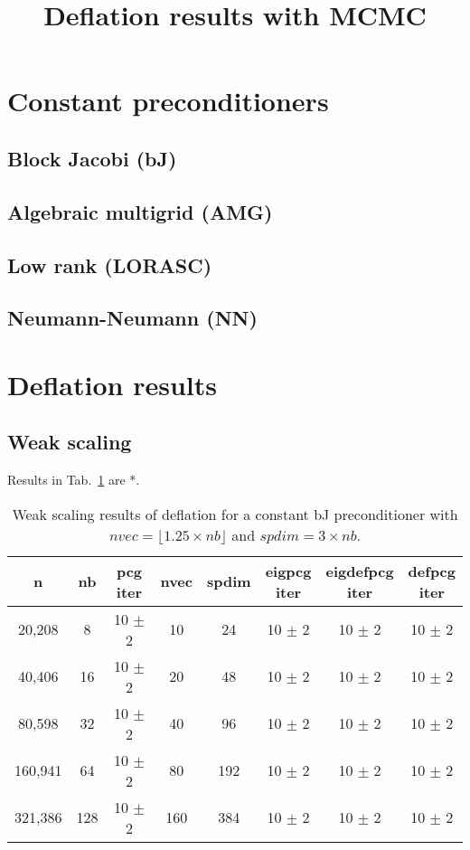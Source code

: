 \documentclass{article}
\title{Deflation results with MCMC}
\begin{document}
\maketitle

\section{Constant preconditioners}

\subsection{Block Jacobi (bJ)}

\subsection{Algebraic multigrid (AMG)}

\subsection{Low rank (LORASC)}


\subsection{Neumann-Neumann (NN)}

\section{Deflation results}

\subsection{Weak scaling}
Results in Tab.~\ref{Tab:005} are *.


\begin{table}[ht]
	\caption{Weak scaling results of deflation for a constant bJ preconditioner with $nvec=\lfloor1.25\times nb\rfloor$ and $spdim=3\times nb$.}
	\centering
	\begin{tabular}{|c|c|c|c|c|c|c|c|}
		\hline
		n & nb & \makecell{pcg\\ iter} & nvec & spdim & \makecell{eigpcg\\ iter} & \makecell{eigdefpcg\\ iter} & \makecell{defpcg\\ iter}\\
		\hline
		20,208  &   8 & 10 $\pm$ 2 &  10 &  24 & 10 $\pm$ 2 & 10 $\pm$ 2 & 10 $\pm$ 2 \\
		40,406  &  16 & 10 $\pm$ 2 &  20 &  48 & 10 $\pm$ 2 & 10 $\pm$ 2 & 10 $\pm$ 2 \\
		80,598  &  32 & 10 $\pm$ 2 &  40 &  96 & 10 $\pm$ 2 & 10 $\pm$ 2 & 10 $\pm$ 2 \\
		160,941 &  64 & 10 $\pm$ 2 &  80 & 192 & 10 $\pm$ 2 & 10 $\pm$ 2 & 10 $\pm$ 2 \\
		321,386 & 128 & 10 $\pm$ 2 & 160 & 384 & 10 $\pm$ 2 & 10 $\pm$ 2 & 10 $\pm$ 2 \\
		\hline
	\end{tabular}
	\label{Tab:005}
\end{table}
\end{document}
